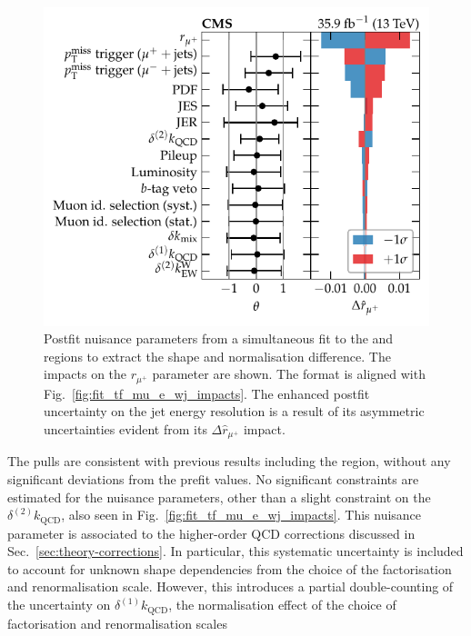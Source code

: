 \begin{figure}[htb]
    \centering
    \includegraphics{chapters/042_backgrounds/images/impacts_tfmup2munwj.pdf}
    \caption[Nuisance parameters from a fit to the positive and negative muon control regions.]{
        Postfit nuisance parameters from a simultaneous fit to the \mupplusjets and \munplusjets regions to extract the shape and normalisation difference. The impacts on the $r_{\mu^+}$ parameter are shown. The format is aligned with Fig.~\ref{fig:fit_tf_mu_e_wj_impacts}. The enhanced postfit uncertainty on the jet energy resolution is a result of its asymmetric uncertainties evident from its $\Delta \hat{r}_{\mu^+}$ impact.
    }
    \label{fig:fit_tf_mup_mun_wj_impacts}
\end{figure}
%
The pulls are consistent with previous results including the \muplusjets
region, without any significant deviations from the prefit values. No
significant constraints are estimated for the nuisance parameters, other than
a slight constraint on the $\delta^{(2)}k_{\mathrm{QCD}}$, also seen in
Fig.~\ref{fig:fit_tf_mu_e_wj_impacts}. This nuisance parameter is associated
to the higher-order QCD corrections discussed in
Sec.~\ref{sec:theory-corrections}. In particular, this systematic uncertainty
is included to account for unknown shape dependencies from the choice of the
factorisation and renormalisation scale. However, this introduces a partial
double-counting of the uncertainty on $\delta^{(1)}k_{\mathrm{QCD}}$, the
normalisation effect of the choice of factorisation and renormalisation scales

